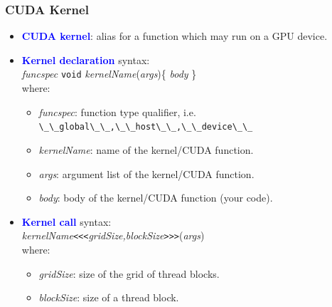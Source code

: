 \begin{frame}
   \frametitle{CUDA Kernel}
      \begin{itemize}	
	      \item \textbf{\textcolor{blue}{CUDA kernel}}: alias for a function which may run on a GPU device.
	 \item \textbf{\textcolor{blue}{Kernel declaration}} syntax:\\
	       \hspace{6ex}\textit{funcspec} \lstinline[style=MyCudaStyle]|void| \textit{kernelName}(\textit{args})\{ \textit{body} \} \\
               where:
               \begin{itemize}
		  \item \textit{funcspec}: function type qualifier, i.e.\\\lstinline[style=MyCudaStyle]|\_\_global\_\_,\_\_host\_\_,\_\_device\_\_|
                  \item \textit{kernelName}: name of the kernel/CUDA function.
                  \item \textit{args}: argument list of the kernel/CUDA function.
                  \item \textit{body}: body of the kernel/CUDA function (your code).			  
	       \end{itemize}
       \item \textbf{\textcolor{blue}{Kernel call}} syntax:\\
		 \hspace{6ex}\textit{kernelName}\texttt{<<<}\textit{gridSize,blockSize}\texttt{>>>}(\textit{args})\\
               where:
               \begin{itemize}
		  \item \textit{gridSize}: size of the grid of thread blocks.
		  \item \textit{blockSize}: size of a thread block.		       
               \end{itemize}			       
      \end{itemize}
\end{frame}	

